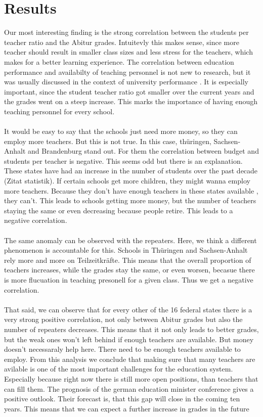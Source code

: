 \section*{Results}
Our most interesting finding is the strong correlation between the students per teacher ratio and the Abitur grades. Intuitevly this makes sense, since more teacher should result in smaller class sizes and less stress for the teachers, which makes for a better learning experience. The correlation between education performance and availabilty of teaching personnel is not new to research, but it was usually discussed in the context of university performance  \cite{doi:10.1080/00220485.1984.10845072}. It is especially important, since the student teacher ratio got smaller over the current years and the grades went on a steep increase. This marks the importance of having enough teaching personnel for every school.\\\\
It would be easy to say that the schools just need more money, so they can employ more teachers. But this is not true. In this case, thüringen, Sachsen-Anhalt and Brandenburg stand out. For them the correlation between budget and students per teacher is negative. This seems odd but there is an explanation. These states have had an increase in the number of students over the past decade (Zitat statistik).  If certain schools get more children, they might wanna employ more teachers. Because they don't have enough teachers in these states available \cite{Kultusministerkonferenz}, they can't. This leads to schools getting more money, but the number of teachers staying the same or even decreasing because people retire. This leads to a negative correlation.\\\\
The same anomaly can be observed with the repeaters. Here, we think a different phenomenon is accountable for this. Schools in Thüringen and Sachsen-Anhalt rely more and more on Teilzeitkräfte. This means that the overall proportion of teachers increases, while the grades stay the same, or even worsen, becasue there is more flucuation in teaching presonell for a given class. Thus we get a negative correlation.\\\\
That said, we can observe that for every other of the 16 federal states there is a very strong positive correlation, not only between Abitur grades but also the number of repeaters decreases. This means that it not only leads to better grades, but the weak ones won't left behind if enough teachers are available. But money doesn't necessaraly help here. There need to be enough teachers available to employ. From this analysis we conclude that making sure that many teachers are avilable is one of the most important challenges for the education system. Especially because right now there is still more open positions, than teachers that can fill them. The prognosis of the german education minister conference \cite{Kultusministerkonferenz} gives a positive outlook. Their forecast is, that this gap will close in the coming ten years. This means that we can expect a further increase in grades in the future\\\\
